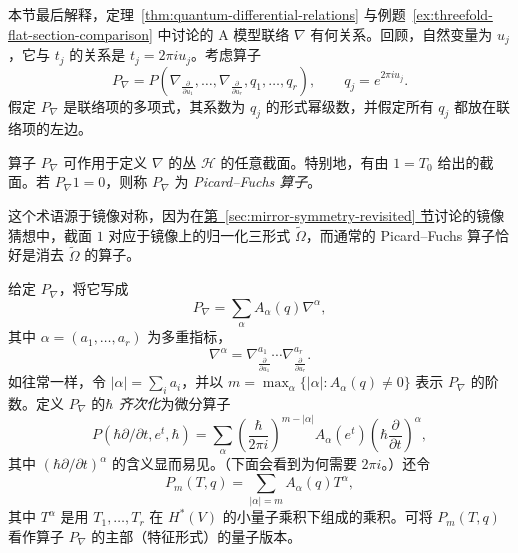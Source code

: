 本节最后解释，定理~\ref{thm:quantum-differential-relations} 与例题~\ref{ex:threefold-flat-section-comparison} 中讨论的 A 模型联络 $\nabla$ 有何关系。回顾，自然变量为 $u_j$，它与 $t_j$ 的关系是 $t_j=2\pi iu_j$。考虑算子
\[
P_\nabla=P\left(\nabla_{\frac\partial{\partial u_1}},\ldots,
\nabla_{\frac\partial{\partial u_r}},q_1,\ldots,q_r\right),
\qquad q_j=e^{2\pi iu_j}.
\]
假定 $P_\nabla$ 是联络项的多项式，其系数为 $q_j$ 的形式幂级数，并假定所有 $q_j$ 都放在联络项的左边。

\begingroup\linespread{1.18}\selectfont
算子 $P_\nabla$ 可作用于定义 $\nabla$ 的丛 $\mathcal H$ 的任意截面。特别地，有由 $1=T_0$ 给出的截面。若 $P_\nabla1=0$，则称 $P_\nabla$ 为 \emph{Picard--Fuchs 算子}。

这个术语源于镜像对称，因为在\hyperref[sec:mirror-symmetry-revisited]{第~\ref*{sec:mirror-symmetry-revisited} 节}讨论的镜像猜想中，截面 $1$ 对应于镜像上的归一化三形式 $\widetilde\Omega$，而通常的 Picard--Fuchs 算子恰好是消去 $\widetilde\Omega$ 的算子。

给定 $P_\nabla$，将它写成
\begin{equation}\label{eq:a-model-picard-fuchs-operator}
P_\nabla=\sum_\alpha A_\alpha(q)\nabla^\alpha,
\end{equation}
其中 $\alpha=(a_1,\ldots,a_r)$ 为多重指标，
\[
\nabla^\alpha=\nabla_{\frac\partial{\partial u_1}}^{a_1}\cdots
\nabla_{\frac\partial{\partial u_r}}^{a_r}.
\]
如往常一样，令 $|\alpha|=\sum_i a_i$，并以 $m=\max_\alpha\{|\alpha|:A_\alpha(q)\ne0\}$ 表示 $P_\nabla$ 的阶数。定义 $P_\nabla$ 的\emph{$\hbar$ 齐次化}为微分算子
\begin{equation}\label{eq:picard-fuchs-homogenization}
P(\hbar\partial/\partial t,e^t,\hbar)
=\sum_\alpha\left(\frac\hbar{2\pi i}\right)^{m-|\alpha|}
A_\alpha(e^t)\left(\hbar\frac\partial{\partial t}\right)^\alpha,
\end{equation}
其中 $(\hbar\partial/\partial t)^\alpha$ 的含义显而易见。（下面会看到为何需要 $2\pi i$。）还令
\[
P_m(T,q)=\sum_{|\alpha|=m}A_\alpha(q)T^\alpha,
\]
其中 $T^\alpha$ 是用 $T_1,\ldots,T_r$ 在 $H^*(V)$ 的小量子乘积下组成的乘积。可将 $P_m(T,q)$ 看作算子 $P_\nabla$ 的主部（特征形式）的量子版本。

